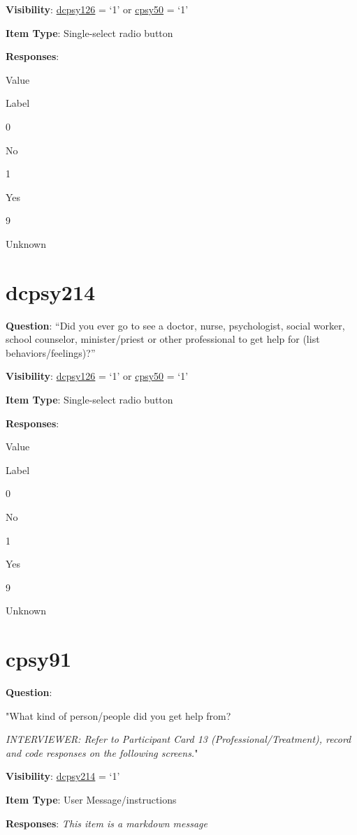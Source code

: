 \documentclass[]{book}
\begin{document}
\textbf{Visibility}: \protect\hyperlink{dcpsy126}{dcpsy126} = `1' or \protect\hyperlink{cpsy50}{cpsy50} = `1'

\textbf{Item Type}: Single-select radio button

\textbf{Responses}:

Value

Label

0

No

1

Yes

9

Unknown

\hypertarget{dcpsy214}{%
\section{dcpsy214}\label{dcpsy214}}

\textbf{Question}: ``Did you ever go to see a doctor, nurse, psychologist, social worker, school counselor, minister/priest or other professional to get help for (list behaviors/feelings)?''

\textbf{Visibility}: \protect\hyperlink{dcpsy126}{dcpsy126} = `1' or \protect\hyperlink{cpsy50}{cpsy50} = `1'

\textbf{Item Type}: Single-select radio button

\textbf{Responses}:

Value

Label

0

No

1

Yes

9

Unknown

\hypertarget{cpsy91}{%
\section{cpsy91}\label{cpsy91}}

\textbf{Question}:

"What kind of person/people did you get help from?

\emph{INTERVIEWER: Refer to Participant Card 13 (Professional/Treatment), record and code responses on the following screens.}"

\textbf{Visibility}: \protect\hyperlink{dcpsy214}{dcpsy214} = `1'

\textbf{Item Type}: User Message/instructions

\textbf{Responses}: \emph{This item is a markdown message}
\end{document}
